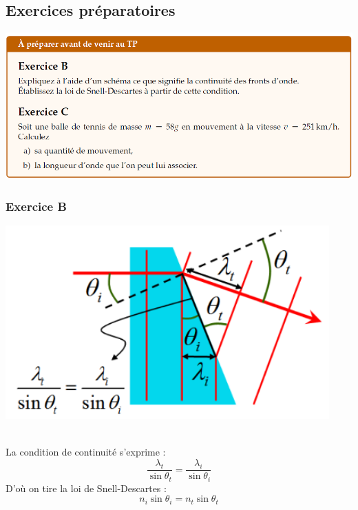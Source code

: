 \documentclass	[11pt, a4paper, openany]{book}
\begin{document}
		
		\newpage
		\subsection{Exercices préparatoires}
		\begin{center}
			\includegraphics[scale=0.60]{prepa/physmB.png}\\
		\end{center}
		\subsubsection*{Exercice B}
		\begin{center}
			\includegraphics[scale=0.50]{prepa/DESC.png}
		\end{center}
		\ \\ La condition de continuité s'exprime :
		$$\frac{\lambda_t}{\sin \theta_t} = \frac{\lambda_i}{\sin \theta_i}$$
		D'où on tire la loi de Snell-Descartes :
		$$n_i \sin \theta_i = n_t \sin \theta_t$$
		
\end{document}
